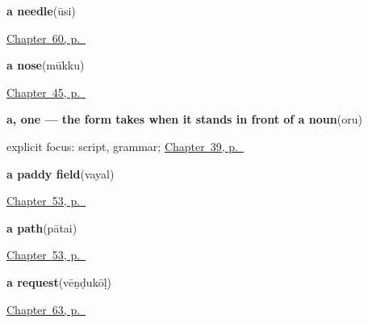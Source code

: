 \noindent\begin{minipage}[t]{\linewidth}
\raggedright
\textbf{a needle}\enspace\emph{}\enspace(ūsi)\par
\footnotesize \hyperref[ch:ta-things-people-make]{Chapter~60, p.~\pageref*{ch:ta-things-people-make}}
\end{minipage}\par\smallskip

\noindent\begin{minipage}[t]{\linewidth}
\raggedright
\textbf{a nose}\enspace\emph{}\enspace(mūkku)\par
\footnotesize \hyperref[ch:ta-body-more]{Chapter~45, p.~\pageref*{ch:ta-body-more}}
\end{minipage}\par\smallskip

\noindent\begin{minipage}[t]{\linewidth}
\raggedright
\textbf{a, one — the form  takes when it stands in front of a noun}\enspace\emph{}\enspace(oru)\par
\footnotesize explicit focus: script, grammar; \hyperref[ch:ta-asking-for-what-you-want]{Chapter~39, p.~\pageref*{ch:ta-asking-for-what-you-want}}
\end{minipage}\par\smallskip

\noindent\begin{minipage}[t]{\linewidth}
\raggedright
\textbf{a paddy field}\enspace\emph{}\enspace(vayal)\par
\footnotesize \hyperref[ch:ta-the-land]{Chapter~53, p.~\pageref*{ch:ta-the-land}}
\end{minipage}\par\smallskip

\noindent\begin{minipage}[t]{\linewidth}
\raggedright
\textbf{a path}\enspace\emph{}\enspace(pātai)\par
\footnotesize \hyperref[ch:ta-the-land]{Chapter~53, p.~\pageref*{ch:ta-the-land}}
\end{minipage}\par\smallskip

\noindent\begin{minipage}[t]{\linewidth}
\raggedright
\textbf{a request}\enspace\emph{}\enspace(vēṇḍukōḷ)\par
\footnotesize \hyperref[ch:ta-asking-well]{Chapter~63, p.~\pageref*{ch:ta-asking-well}}
\end{minipage}\par\smallskip

